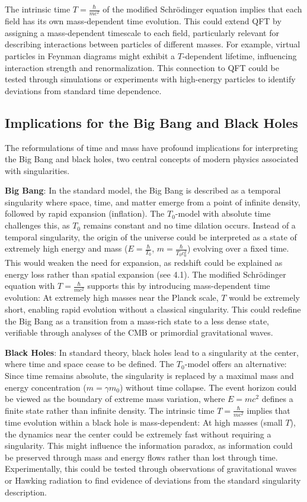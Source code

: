 \documentclass[a4paper,12pt]{article}
\begin{document}
	The intrinsic time \( T = \frac{\hbar}{m c^2} \) of the modified Schrödinger equation implies that each field has its own mass-dependent time evolution. This could extend QFT by assigning a mass-dependent timescale to each field, particularly relevant for describing interactions between particles of different masses. For example, virtual particles in Feynman diagrams might exhibit a \( T \)-dependent lifetime, influencing interaction strength and renormalization. This connection to QFT could be tested through simulations or experiments with high-energy particles to identify deviations from standard time dependence.
	
	\subsection{Implications for the Big Bang and Black Holes}
	The reformulations of time and mass have profound implications for interpreting the Big Bang and black holes, two central concepts of modern physics associated with singularities.
	
	\textbf{Big Bang}: In the standard model, the Big Bang is described as a temporal singularity where space, time, and matter emerge from a point of infinite density, followed by rapid expansion (inflation). The \( T_0 \)-model with absolute time challenges this, as \( T_0 \) remains constant and no time dilation occurs. Instead of a temporal singularity, the origin of the universe could be interpreted as a state of extremely high energy and mass (\( E = \frac{\hbar}{T_0} \), \( m = \frac{\hbar}{T_0 c_0^2} \)) evolving over a fixed time. This would weaken the need for expansion, as redshift could be explained as energy loss rather than spatial expansion (see 4.1). The modified Schrödinger equation with \( T = \frac{\hbar}{m c^2} \) supports this by introducing mass-dependent time evolution: At extremely high masses near the Planck scale, \( T \) would be extremely short, enabling rapid evolution without a classical singularity. This could redefine the Big Bang as a transition from a mass-rich state to a less dense state, verifiable through analyses of the CMB or primordial gravitational waves.
	
	\textbf{Black Holes}: In standard theory, black holes lead to a singularity at the center, where time and space cease to be defined. The \( T_0 \)-model offers an alternative: Since time remains absolute, the singularity is replaced by a maximal mass and energy concentration (\( m = \gamma m_0 \)) without time collapse. The event horizon could be viewed as the boundary of extreme mass variation, where \( E = m c^2 \) defines a finite state rather than infinite density. The intrinsic time \( T = \frac{\hbar}{m c^2} \) implies that time evolution within a black hole is mass-dependent: At high masses (small \( T \)), the dynamics near the center could be extremely fast without requiring a singularity. This might influence the information paradox, as information could be preserved through mass and energy flows rather than lost through time. Experimentally, this could be tested through observations of gravitational waves or Hawking radiation to find evidence of deviations from the standard singularity description.
	
\end{document}
